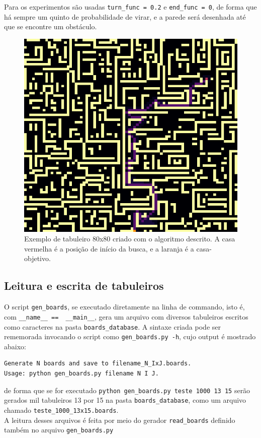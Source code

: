 \documentclass[12pt]{article}
\begin{document}
Para os experimentos são usadas \verb|turn_func = 0.2| e \verb|end_func = 0|, de forma que há sempre um quinto de probabilidade de virar, e a parede será desenhada até que se encontre um obstáculo.

\begin{figure}[h!]
	\centering
	\label{fig:trapezoidal}
	\includegraphics[width=.7\textwidth]{80x80}
	\caption{Exemplo de tabuleiro 80x80 criado com o algoritmo descrito. A casa vermelha é a posição de início da busca, e a laranja é a casa-objetivo.}
\end{figure}

\subsection{Leitura e escrita de tabuleiros}
O script \verb|gen_boards|, se executado diretamente na linha de commando, isto é, com \verb|__name__ ==  __main__|, gera um arquivo com diversos tabuleiros escritos como caracteres na pasta \verb|boards_database|. A sintaxe criada pode ser rememorada invocando o script como \verb|gen_boards.py -h|, cujo output é mostrado abaixo:\\

\begin{verbatim}
Generate N boards and save to filename_N_IxJ.boards.
Usage: python gen_boards.py filename N I J.
\end{verbatim}

de forma que se for executado \verb|python gen_boards.py teste 1000 13 15| serão gerados mil tabuleiros 13 por 15 na pasta \verb|boards_database|, como um arquivo chamado \verb|teste_1000_13x15.boards|.\\

A leitura desses arquivos é feita por meio do gerador \verb|read_boards| definido também no arquivo \verb|gen_boards.py|
\end{document}
